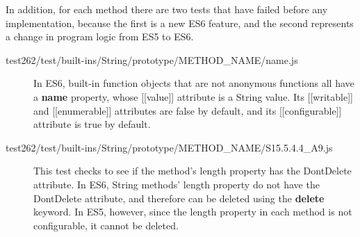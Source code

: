 \documentclass[a4paper,11pt,twoside]{report}
\begin{document}
In addition, for each method there are two tests that have failed before any implementation, because the first is a new ES6 feature, and the second represents a change in program logic from ES5 to ES6.

\begin{description}
\item[test262/test/built-ins/String/prototype/METHOD\_NAME/name.js] In ES6, built-in function objects that are not anonymous functions all have a \textbf{name} property, whose [[value]] attribute is a String value. Its [[writable]] and [[enumerable]] attributes are false by default, and its [[configurable]] attribute is true by default.

\item[test262/test/built-ins/String/prototype/METHOD\_NAME/S15.5.4.4\_A9.js] This test checks to see if the method's length property has the DontDelete attribute. In ES6, String methods' length property do not have the DontDelete attribute, and therefore can be deleted using the \textbf{delete} keyword. In ES5, however, since the length property in each method is not configurable, it cannot be deleted.
\end{description}
\end{document}
